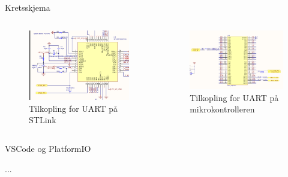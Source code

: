 \begin{frame}{Kretsskjema}
	
\begin{columns}[c]
	\begin{column}{.5\textwidth}
		\begin{figure}
			\centering
				\includegraphics[width=0.95\linewidth]{img/stlink-uart}
			\caption{Tilkopling for UART på STLink}
		\end{figure}      
	\end{column}
	\begin{column}{.5\textwidth}
		\begin{figure}
			\centering
				\includegraphics[width=0.95\linewidth]{img/mcu-uart}
			\caption{Tilkopling for UART på mikrokontrolleren}
		\end{figure}
	\end{column}
\end{columns}
	
\end{frame}


\begin{frame}[containsverbatim]{VSCode og PlatformIO}
	
...
	
	
\end{frame}